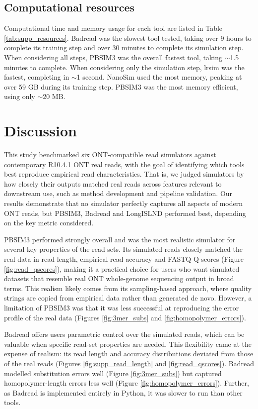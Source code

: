 \documentclass[webpdf,modern,large]{biorxiv}
\begin{document}
\subsection{Computational resources}

Computational time and memory usage for each tool are listed in Table \ref{tab:supp_resources}. Badread was the slowest tool tested, taking over 9 hours to complete its training step and over 30 minutes to complete its simulation step. When considering all steps, PBSIM3 was the overall fastest tool, taking $\sim$1.5 minutes to complete. When considering only the simulation step, lrsim was the fastest, completing in $\sim$1 second. NanoSim used the most memory, peaking at over 59 GB during its training step. PBSIM3 was the most memory efficient, using only $\sim$20 MB.



\section{Discussion}

This study benchmarked six ONT‑compatible read simulators against contemporary R10.4.1 ONT real reads, with the goal of identifying which tools best reproduce empirical read characteristics. That is, we judged simulators by how closely their outputs matched real reads across features relevant to downstream use, such as method development and pipeline validation. Our results demonstrate that no simulator perfectly captures all aspects of modern ONT reads, but PBSIM3, Badread and LongISLND performed best, depending on the key metric considered.

PBSIM3 performed strongly overall and was the most realistic simulator for several key properties of the read sets. Its simulated reads closely matched the real data in read length, empirical read accuracy and FASTQ Q-scores (Figure \ref{fig:read_qscores}), making it a practical choice for users who want simulated datasets that resemble real ONT whole-genome sequencing output in broad terms. This realism likely comes from its sampling-based approach, where quality strings are copied from empirical data rather than generated de novo. However, a limitation of PBSIM3 was that it was less successful at reproducing the error profile of the real data (Figures \ref{fig:3mer_subs} and \ref{fig:homopolymer_errors}).

Badread offers users parametric control over the simulated reads, which can be valuable when specific read-set properties are needed. This flexibility came at the expense of realism: its read length and accuracy distributions deviated from those of the real reads (Figures \ref{fig:supp_read_length} and \ref{fig:read_qscores}). Badread modelled substitution errors well (Figure \ref{fig:3mer_subs}) but captured homopolymer-length errors less well (Figure \ref{fig:homopolymer_errors}). Further, as Badread is implemented entirely in Python, it was slower to run than other tools.
\end{document}
